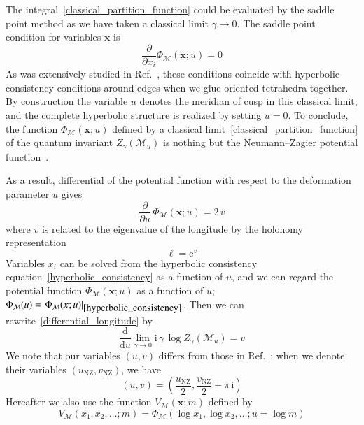 \documentclass[12pt,reqno]{amsart}
\numberwithin{equation}{section}
\newcommand{\I}{\mathrm{i}}
\newcommand{\E}{\mathrm{e}}
\begin{document}
The integral~\eqref{classical_partition_function} could be evaluated
by the saddle point method as we have taken a 
classical
limit $\gamma\to 0$.
The saddle point condition for
variables $\boldsymbol{x}$ is
\begin{equation}
  \label{hyperbolic_consistency}
  \frac{\partial }{\partial x_i}
  \Phi_\mathcal{M} (\boldsymbol{x}   ; u) = 0 
\end{equation}
As was extensively studied in Ref.~,
these conditions coincide with 
hyperbolic consistency conditions around 
edges when we glue oriented tetrahedra together.
By construction
the variable $u$ denotes the meridian of cusp in
this classical limit,
and the complete hyperbolic structure is  realized by setting $u=0$.
To conclude, the function $\Phi_{\mathcal{M}}(\boldsymbol{x} ; u)$
defined 
by a classical limit~\eqref{classical_partition_function} of the
quantum invariant $Z_\gamma(\mathcal{M}_u)$
is nothing but
the
Neumann--Zagier
potential function~\cite{NeumZagi85a,TYoshi85a}.



As a result, differential of the potential function with respect to
the
deformation parameter $u$ gives
\begin{equation}
  \label{differential_longitude}
  \frac{\partial}{\partial  u}  \,
  \Phi_{\mathcal{M}}(\boldsymbol{x} ; u)
  =
  2 \, v
\end{equation}
where $v$ is related to the
eigenvalue of the longitude by the holonomy representation
\begin{equation}
  \ell = \E^{v}
\end{equation}
Variables  $x_i$ can be solved from the hyperbolic consistency
equation~\eqref{hyperbolic_consistency} as a function of $u$,
and we can regard the potential function
$\Phi_\mathcal{M}(\boldsymbol{x};u)$ as a function of $u$;
$\Phi_\mathcal{M}(u) =
\left.
  \Phi_{\mathcal{M}}( \boldsymbol{x} ; u)
\right|_{\eqref{hyperbolic_consistency}}$.
Then we can rewrite~\eqref{differential_longitude} by
\begin{equation}
  \label{v_differential_limit}
  \frac{\mathrm{d}}{\mathrm{d} u}
  \lim_{\gamma \to 0 }
  \I \, \gamma \,
  \log Z_\gamma\left( \mathcal{M}_u \right)
  =  v
\end{equation}
We note that our variables $(u,v)$ differs from those in
Ref.~;
when we denote their variables $(u_{\text{NZ}}, v_{\text{NZ}})$, we
have
\begin{equation}
  \label{uv_NZ}
  (u, v) =
  \left(
    \frac{u_{\text{NZ}}}{2} ,
    \frac{v_{\text{NZ}}}{2} + \pi \, \I
  \right)
\end{equation}
Hereafter we  also use  the function
$V_{\mathcal{M}}(\boldsymbol{x}; m)$ defined by
\begin{equation}
  V_{\mathcal{M}}(x_1, x_2, \dots ; m)
  =
  \Phi_{\mathcal{M}}(\log x_1, \log x_2, \dots ;  u=\log m)
\end{equation}
\end{document}
